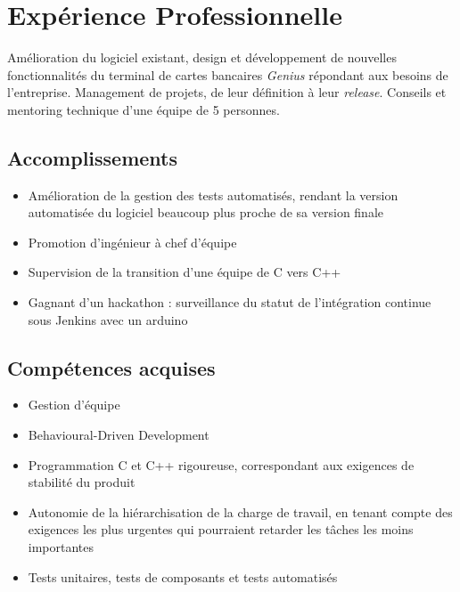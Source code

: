 \documentclass{cv}
\begin{document}
\iffalse\contact{adresse ligne 1}
        {adresse ligne 2}
        {adresse ligne 3}
        {adresse@email.fr}
        {+numéro~de~téléphone}
\fi

\section{Expérience Professionnelle}
{Amélioration du logiciel existant, design et développement de nouvelles fonctionnalités du terminal de cartes bancaires \textit{Genius} répondant aux besoins de l'entreprise. Management de projets, de leur définition à leur \textit{release}. Conseils et mentoring technique d'une équipe de 5 personnes.}
\subsection{Accomplissements}
\begin{itemize}
    \item {Amélioration de la gestion des tests automatisés, rendant la version automatisée du logiciel beaucoup plus proche de sa version finale}
    \item {Promotion d'ingénieur à chef d'équipe}
    \item {Supervision de la transition d'une équipe de C vers C++}
    \item {Gagnant d'un hackathon : surveillance du statut de l'intégration continue sous Jenkins avec un arduino}%
\end{itemize}
\subsection{Compétences acquises}
\begin{itemize}
    \item {Gestion d'équipe}
    \item {Behavioural-Driven Development}
    \item {Programmation C et C++ rigoureuse, correspondant aux exigences de stabilité du produit}
    \item {Autonomie de la hiérarchisation de la charge de travail, en tenant compte des exigences les plus urgentes qui pourraient retarder les tâches les moins importantes}
    \item {Tests unitaires, tests de composants et tests automatisés}
\end{itemize}
\end{document}
